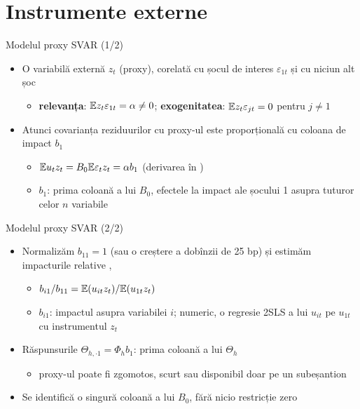 \section{Instrumente externe}

\begin{frame}{Modelul proxy SVAR (1/2)}
\itemsize{\small}
\begin{itemize}
    \item O variabilă externă $z_t$ (proxy), corelată cu șocul de interes $\varepsilon_{1t}$ și cu niciun alt șoc
    \begin{itemize}
        \item \textbf{relevanța}: $\mathbb{E} z_t\varepsilon_{1t} = \alpha \ne 0$; \textbf{exogenitatea}: $\mathbb{E} z_t\varepsilon_{jt} = 0$ pentru $j \ne 1$
    \end{itemize}
    \item Atunci covarianța reziduurilor cu proxy-ul este proporțională cu coloana de impact $b_1$
    \begin{itemize}
        \item $\mathbb{E} u_tz_t = B_0\mathbb{E}\varepsilon_tz_t = \alpha b_1$ (derivarea în )
        \item $b_1$: prima coloană a lui $B_0$, efectele la impact ale șocului 1 asupra tuturor celor $n$ variabile
    \end{itemize}
\end{itemize}
\end{frame}

\begin{frame}{Modelul proxy SVAR (2/2)}
\itemsize{\small}
\begin{itemize}
    \item Normalizăm $b_{11} = 1$ (sau o creștere a dobînzii de 25 bp) și estimăm impacturile relative , 
    \begin{itemize}
        \item $b_{i1}/b_{11} = \mathbb{E}(u_{it}z_t)/\mathbb{E}(u_{1t}z_t)$
        \item $b_{i1}$: impactul asupra variabilei $i$; numeric, o regresie 2SLS a lui $u_{it}$ pe $u_{1t}$ cu instrumentul $z_t$
    \end{itemize}
    \item Răspunsurile $\Theta_{h,\cdot1} = \Phi_hb_1$: prima coloană a lui $\Theta_h$
    \begin{itemize}
        \item proxy-ul poate fi zgomotos, scurt sau disponibil doar pe un subeșantion
    \end{itemize}
    \item Se identifică o singură coloană a lui $B_0$, fără nicio restricție zero
\end{itemize}
\end{frame}

